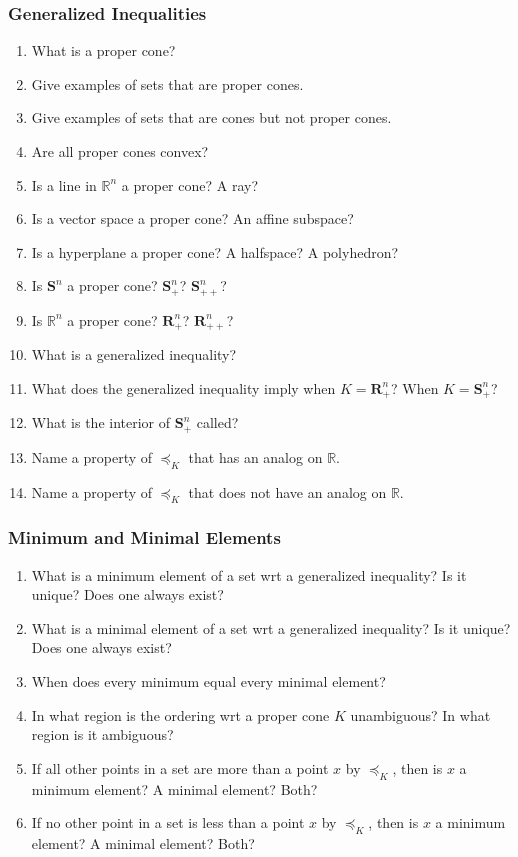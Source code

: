 \documentclass[]{article}
\newcommand{\R}{\mathbb{R}}
\newcommand{\Rn}{\mathbb{R}^{n}}
\newcommand{\Rnp}{\boldsymbol{R}^{n}_{+}}
\newcommand{\Rnpp}{\boldsymbol{R}^{n}_{++}}
\newcommand{\Sn}{\boldsymbol{S}^{n}}
\newcommand{\Snp}{\boldsymbol{S}^{n}_{+}}
\newcommand{\Snpp}{\boldsymbol{S}^{n}_{++}}
\newcounter{q}
\begin{document}
\subsubsection*{Generalized Inequalities}

\begin{enumerate}[resume*]
\item What is a proper cone?
\item Give examples of sets that are proper cones.
\item Give examples of sets that are cones but not proper cones.
\item Are all proper cones convex?
\item Is a line in $\Rn$ a proper cone? A ray?
\item Is a vector space a proper cone? An affine subspace?
\item Is a hyperplane a proper cone? A halfspace? A polyhedron?
\item Is $\Sn$ a proper cone? $\Snp$? $\Snpp$?
\item Is $\Rn$ a proper cone? $\Rnp$? $\Rnpp$?
\item What is a generalized inequality?
\item What does the generalized inequality imply when $K=\Rnp$? When $K=\Snp$?
\item What is the interior of $\Snp$ called?
\item Name a property of $\preceq_{K}$ that has an analog on $\R$.
\item Name a property of $\preceq_{K}$ that does not have an analog on $\R$.
\end{enumerate}

\subsubsection*{Minimum and Minimal Elements}

\begin{enumerate}[resume*]
\item What is a minimum element of a set wrt a generalized inequality? Is it unique? Does one always exist?
\item What is a minimal element of a set wrt a generalized inequality? Is it unique? Does one always exist?
\item When does every minimum equal every minimal element?
\item In what region is the ordering wrt a proper cone $K$ unambiguous? In what region is it ambiguous?
\item If all other points in a set are more than a point $x$ by $\preceq_{K}$, then is $x$ a minimum element? A minimal element? Both?
\item If no other point in a set is less than a point $x$ by $\preceq_{K}$, then is $x$ a minimum element? A minimal element? Both?
\end{enumerate}
\end{document}
